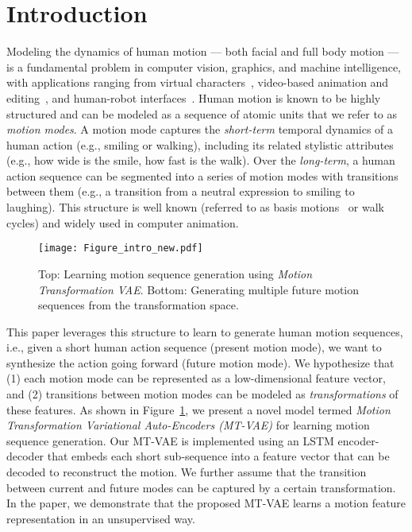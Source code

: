 \documentclass[runningheads]{llncs}
\newcommand{\cutsectiondown}{\vspace*{-0.12in}}
\begin{document}
\section{Introduction}
\cutsectiondown
{}
Modeling the dynamics of human motion --- both facial and full body motion --- is a fundamental problem in computer vision, graphics, and machine intelligence, with applications ranging from virtual characters~\cite{deAguiar2008performance,beeler2011performance}, video-based animation and editing~\cite{yang2011expression,suwajanakorn2015makes,suwajanakorn2017synthesizing}, and human-robot interfaces~\cite{sermanet2017time}.    
Human motion is known to be highly structured and can be modeled as a sequence of atomic units that we refer to as \emph{motion modes}.
A motion mode captures the \emph{short-term} temporal dynamics of a human action (e.g., smiling or walking), including its related stylistic attributes (e.g., how wide is the smile, how fast is the walk). 
Over the \emph{long-term}, a human action sequence can be segmented into a series of motion modes with transitions between them (e.g., a transition from a neutral expression to smiling to laughing).
This structure is well known (referred to as basis motions~\cite{rose1996motiontransitions} or walk cycles) and widely used in computer animation.


\begin{figure}[t]
\centering
\texttt{[image: Figure\_intro\_new.pdf]}
\caption{Top: Learning motion sequence generation using \emph{Motion Transformation VAE}. Bottom: Generating multiple future motion sequences from the transformation space.}
\label{figure:figure_intro}
\vspace*{-0.25in}
\end{figure}

This paper leverages this structure to learn to generate human motion sequences, i.e., given a short human action sequence (present motion mode), we want to synthesize the action going forward (future motion mode).
We hypothesize that (1) each motion mode can be represented as a low-dimensional feature vector, and (2) transitions between motion modes can be modeled as \textit{transformations} of these features. 
As shown in Figure~\ref{figure:figure_intro}, we present a novel model termed \emph{Motion Transformation Variational Auto-Encoders (MT-VAE)} for learning motion sequence generation.
Our MT-VAE is implemented using an LSTM encoder-decoder that embeds each short sub-sequence into a feature vector that can be decoded to reconstruct the motion.
We further assume that the transition between current and future modes can be captured by a certain transformation.
In the paper, we demonstrate that the proposed MT-VAE learns a motion feature representation in an unsupervised way. 
\end{document}
